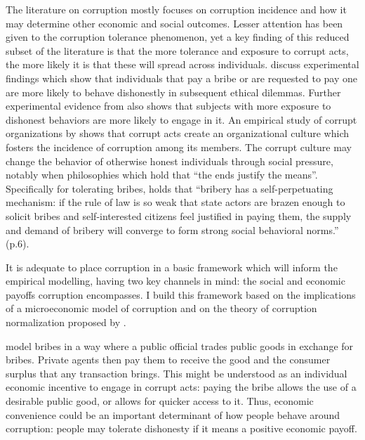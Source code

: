 \documentclass[12pt,a4]{article}\usepackage[]{graphicx}\usepackage[]{xcolor}
\begin{document}
The literature on corruption mostly focuses on corruption incidence and how it may determine other economic and social outcomes. Lesser attention has been given to the corruption tolerance phenomenon, yet a key finding of this reduced subset of the literature is that the more tolerance and exposure to corrupt acts, the more likely it is that these will spread across individuals. \textcite{Ariely.2019} discuss experimental findings which show that individuals that pay a bribe or are requested to pay one are more likely to behave dishonestly in subsequent ethical dilemmas. Further experimental evidence from \textcite{Gino.2009} also shows that subjects with more exposure to dishonest behaviors are more likely to engage in it. An empirical study of corrupt organizations by \textcite{Campbell.2014} shows that corrupt acts create an organizational culture which fosters the incidence of corruption among its members. The corrupt culture may change the behavior of otherwise honest individuals through social pressure, notably when philosophies which hold that \enquote{the ends justify the means}. Specifically for tolerating bribes, \textcite{Carlin.2013} holds that \enquote{bribery has a self-perpetuating mechanism: if the rule of law is so weak that state actors are brazen enough to solicit bribes and self-interested citizens feel justified in paying them, the supply and demand of bribery will converge to form strong social behavioral norms.} (p.6). 

It is adequate to place corruption in a basic framework which will inform the empirical modelling, having two key channels in mind: the social and economic payoffs corruption encompasses. I build this framework based on the implications of a  microeconomic model of corruption and on the theory of corruption normalization proposed by \textcite{Ashforth.2003}.

\textcite{Shleifer.1993} model bribes in a way where a public official trades public goods in exchange for bribes. Private agents then pay them to receive the good and the consumer surplus that any transaction brings. This might be understood as an individual economic incentive to engage in corrupt acts: paying the bribe allows the use of a desirable public good, or allows for quicker access to it. Thus, economic convenience could be an important determinant of how people behave around corruption: people may tolerate dishonesty if it means a positive economic payoff. 
\end{document}
